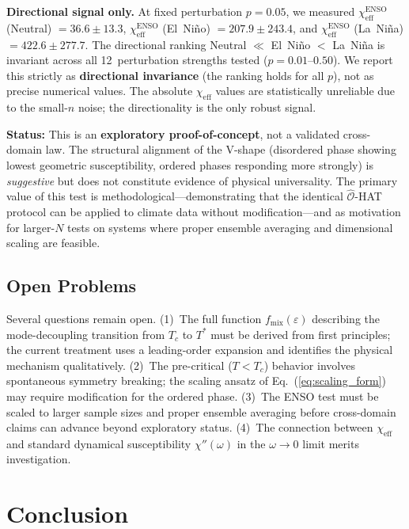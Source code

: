 \documentclass[aps,prl,twocolumn,superscriptaddress,byrevtex]{article}
\begin{document}
\textbf{Directional signal only.} At fixed perturbation $p=0.05$, we measured $\chi_{\text{eff}}^{\text{ENSO}}$ (Neutral) $= 36.6 \pm 13.3$, $\chi_{\text{eff}}^{\text{ENSO}}$ (El~Ni\~{n}o) $= 207.9 \pm 243.4$, and $\chi_{\text{eff}}^{\text{ENSO}}$ (La~Ni\~{n}a) $= 422.6 \pm 277.7$. The directional ranking Neutral $\ll$ El~Ni\~{n}o $<$ La~Ni\~{n}a is invariant across all 12~perturbation strengths tested ($p = 0.01$--$0.50$). We report this strictly as \textbf{directional invariance} (the ranking holds for all $p$), not as precise numerical values. The absolute $\chi_{\text{eff}}$ values are statistically unreliable due to the small-$n$ noise; the directionality is the only robust signal.

\textbf{Status:} This is an \textbf{exploratory proof-of-concept}, not a validated cross-domain law. The structural alignment of the V-shape (disordered phase showing lowest geometric susceptibility, ordered phases responding more strongly) is \emph{suggestive} but does not constitute evidence of physical universality. The primary value of this test is methodological---demonstrating that the identical $\hat{\mathcal{O}}$-HAT protocol can be applied to climate data without modification---and as motivation for larger-$N$ tests on systems where proper ensemble averaging and dimensional scaling are feasible.

\subsection{Open Problems}

Several questions remain open. (1)~The full function $f_{\text{mix}}(\varepsilon)$ describing the mode-decoupling transition from $T_c$ to $T^*$ must be derived from first principles; the current treatment uses a leading-order expansion and identifies the physical mechanism qualitatively. (2)~The pre-critical ($T < T_c$) behavior involves spontaneous symmetry breaking; the scaling ansatz of Eq.~(\ref{eq:scaling_form}) may require modification for the ordered phase. (3)~The ENSO test must be scaled to larger sample sizes and proper ensemble averaging before cross-domain claims can advance beyond exploratory status. (4)~The connection between $\chi_{\text{eff}}$ and standard dynamical susceptibility $\chi''(\omega)$ in the $\omega \to 0$ limit merits investigation.

\section{Conclusion}
\end{document}
